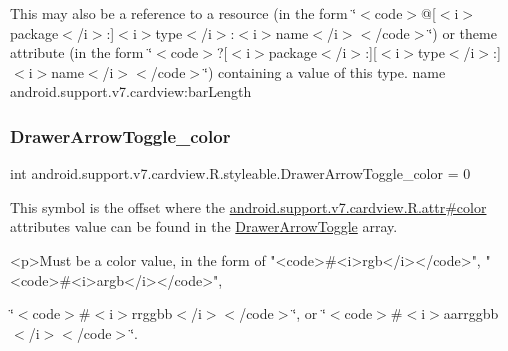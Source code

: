 This may also be a reference to a resource (in the form \char`\"{}$<$code$>$@\mbox{[}$<$i$>$package$<$/i$>$\+:\mbox{]}$<$i$>$type$<$/i$>$\+:$<$i$>$name$<$/i$>$$<$/code$>$\char`\"{}) or theme attribute (in the form \char`\"{}$<$code$>$?\mbox{[}$<$i$>$package$<$/i$>$\+:\mbox{]}\mbox{[}$<$i$>$type$<$/i$>$\+:\mbox{]}$<$i$>$name$<$/i$>$$<$/code$>$\char`\"{}) containing a value of this type.  name android.\+support.\+v7.\+cardview\+:bar\+Length \mbox{\label{classandroid_1_1support_1_1v7_1_1cardview_1_1R_1_1styleable_ae91140445253d7469509b370ae70f855}} 
\subsubsection{\texorpdfstring{Drawer\+Arrow\+Toggle\+\_\+color}{DrawerArrowToggle\_color}}
{\footnotesize\ttfamily int android.\+support.\+v7.\+cardview.\+R.\+styleable.\+Drawer\+Arrow\+Toggle\+\_\+color = 0\hspace{0.3cm}{\ttfamily [static]}}

This symbol is the offset where the \hyperlink{classandroid_1_1support_1_1v7_1_1cardview_1_1R_1_1attr_a31fd3a6826f001af0482762741e11b2c}{android.\+support.\+v7.\+cardview.\+R.\+attr\#color} attribute\textquotesingle{}s value can be found in the \hyperlink{classandroid_1_1support_1_1v7_1_1cardview_1_1R_1_1styleable_a159ca17c520d2f2d93f6152d01b0b8df}{Drawer\+Arrow\+Toggle} array.

\begin{DoxyVerb}      <p>Must be a color value, in the form of "<code>#<i>rgb</i></code>", "<code>#<i>argb</i></code>",
\end{DoxyVerb}
 \char`\"{}$<$code$>$\#$<$i$>$rrggbb$<$/i$>$$<$/code$>$\char`\"{}, or \char`\"{}$<$code$>$\#$<$i$>$aarrggbb$<$/i$>$$<$/code$>$\char`\"{}. 

